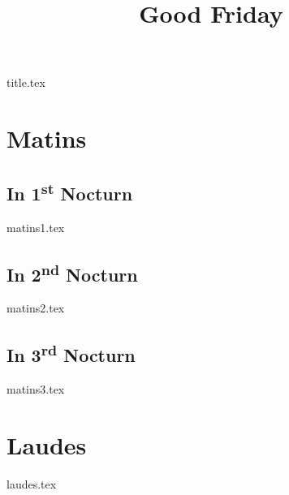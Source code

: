 \documentclass[statementpaper,10pt,openright,openbib]{memoir}
\title{Good Friday}
\begin{document}

{title.tex}

\frontmatter

\mainmatter

\chapter*{Matins}

\section*{In 1\textsuperscript{st} Nocturn}
{matins1.tex}

\section*{In 2\textsuperscript{nd} Nocturn}
{matins2.tex}

\section*{In 3\textsuperscript{rd} Nocturn}
{matins3.tex}

\chapter*{Laudes}

{laudes.tex}
\end{document}
